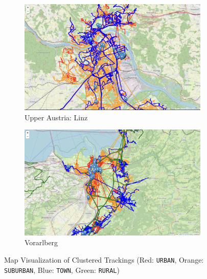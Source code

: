 \documentclass[a4paper,12pt,twoside]{scrreprt}
\begin{document}
\begin{figure}[p]
  \begin{subfigure}[b]{0.495\textwidth}
    \centering

    \includegraphics[width=\textwidth]{Figures/clustering_map/clustering_result_map_linz_urban1.png}
    \caption{Upper Austria: Linz}
    \label{fig:clustering_map_visulaization_linz}
  \end{subfigure}
  \hfill
  \begin{subfigure}[b]{0.495\textwidth}
    \centering

    \includegraphics[width=\textwidth]{Figures/clustering_map/clustering_result_map_vorarlberg_closeup.png}
    \caption{Vorarlberg}
    \label{fig:clustering_map_visulaization_vorarlberg}
  \end{subfigure}

  \caption{Map Visualization of Clustered Trackings (Red: \texttt{URBAN},
    Orange: \texttt{SUBURBAN}, Blue: \texttt{TOWN}, Green: \texttt{RURAL})}
  \label{fig:clstering_map_visualizations}
\end{figure}
\FloatBarrier
\end{document}
